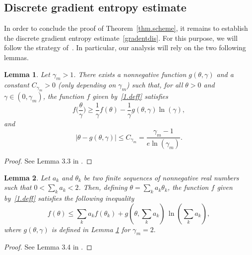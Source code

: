 \documentclass[11pt]{amsart}
\newtheorem{lemma}{Lemma}
\begin{document}
\subsection{Discrete gradient entropy estimate}\label{sec.disgradent}

In order to conclude the proof of Theorem~\ref{thm.scheme}, it remains to establish the discrete gradient entropy estimate~\eqref{gradentdis}. For this purpose, we will follow the strategy of~\cite{2}. In particular, our analysis will rely on the two following lemmas.


\begin{lemma}\label{technical} 
Let $\gamma_m > 1$. There exists a nonnegative function $g(\theta, \gamma)$ and a constant $C_{\gamma_m} > 0$ (only depending on $\gamma_m$) such that, for all $\theta > 0$ and $\gamma \in (0, \gamma_m)$, the function $f$ given by~\eqref{1.deff} satisfies
 \begin{equation*}%
     f\bigg(\frac{\theta}{\gamma}\bigg) \geq \frac{1}{\gamma}f(\theta) - \frac{1}{\gamma}g(\theta,  \gamma)\ln(\gamma),
 \end{equation*}
 and $$|\theta - g(\theta, \gamma)| \leq C_{\gamma_m} = \frac{\gamma_m - 1}{e\ln(\gamma_m)}.$$
\end{lemma}

\begin{proof}
See Lemma 3.3 in \cite{2}.
\end{proof}

\begin{lemma}\label{convexity inequality of f} 
Let $a_k$ and $\theta_k$ be two finite sequences of nonnegative real numbers such that $0< \sum_k a_k < 2$. Then, defining $\theta = \sum_k a_k \theta_k$, the function $f$ given by~\eqref{1.deff} satisfies the following inequality
\[
f(\theta) \leq \sum_k a_k f(\theta_k) + g\left(\theta,\sum_k a_k \right) \, \ln\left(\sum_k a_k\right),
\]
 where $g(\theta,\gamma)$ is defined in Lemma \ref{technical} for $\gamma_m = 2.$
\end{lemma}

\begin{proof}
See Lemma 3.4 in \cite{2}.
\end{proof}
\end{document}

